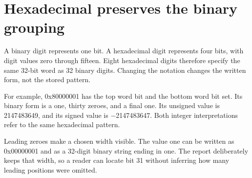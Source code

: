 \section{Hexadecimal preserves the binary
  grouping}\label{004-bit-inspector-p01-hexadecimal-preserves-the-binary-grouping}

A binary digit represents one bit. A hexadecimal digit represents four
bits, with digit values zero through fifteen. Eight hexadecimal digits
therefore specify the same 32-bit word as 32 binary digits. Changing the
notation changes the written form, not the stored pattern.

For example, 0x80000001 has the top word bit and the bottom word bit
set. Its binary form is a one, thirty zeroes, and a final one. Its
unsigned value is 2147483649, and its signed value is \ensuremath{-}2147483647. Both
integer interpretations refer to the same hexadecimal pattern.

Leading zeroes make a chosen width visible. The value one can be written
as 0x00000001 and as a 32-digit binary string ending in one. The report
deliberately keeps that width, so a reader can locate bit 31 without
inferring how many leading positions were omitted.
